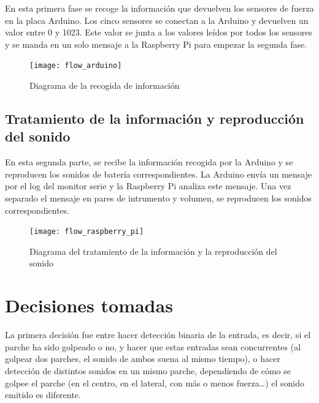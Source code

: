             En esta primera fase se recoge la información que devuelven los sensores de fuerza en la placa Arduino. Los
            cinco sensores se conectan a la Arduino y devuelven un valor entre 0 y 1023. Este valor se junta a los
            valores leídos por todos los sensores y se manda en un solo mensaje a la Raspberry Pi para empezar la
            segunda fase.

            \newpage

            \begin{figure}[ht]
                \centering
                \texttt{[image: flow\_arduino]}
                \caption{Diagrama de la recogida de información \label{fig:DiagramaRecogida}}
            \end{figure}


        \subsection{Tratamiento de la información y reproducción del sonido} %
        \label{sub:TratamientoDeLaInformacionYReproduccionDelSonido}

            En esta segunda parte, se recibe la información recogida por la Arduino y se reproducen los sonidos de
            batería correspondientes. La Arduino envía un mensaje por el log del monitor serie y la Raspberry Pi analiza
            este mensaje. Una vez separado el mensaje en pares de intrumento y volumen, se reproducen los sonidos
            correspondientes.

            \begin{figure}[ht]
                \centering
                \texttt{[image: flow\_raspberry\_pi]}
                \caption{Diagrama del tratamiento de la información y la reproducción del
                sonido \label{fig:DiagramaTratamiento}}
            \end{figure}



    \section{Decisiones tomadas} %
    \label{sec:DecisionesTomadas}

        La primera decisión fue entre hacer detección binaria de la entrada, es decir, si el parche ha sido golpeado o
        no, y hacer que estas entradas sean concurrentes (al golpear dos parches, el sonido de ambos suena al mismo
        tiempo), o hacer detección de distintos sonidos en un mismo parche, dependiendo de cómo se golpee el parche (en
        el centro, en el lateral, con más o menos fuerza…) el sonido emitido es diferente.

